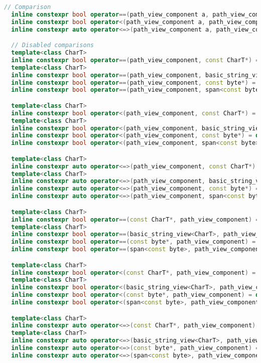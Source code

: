 \documentclass[11pt]{article}
\begin{document}
\begin{lstlisting}[language=cpp]
  // Comparison
  inline constexpr bool operator==(path_view_component a, path_view_component b) noexcept;
  inline constexpr bool operator<(path_view_component a, path_view_component b) noexcept;
  inline constexpr auto operator<=>(path_view_component a, path_view_component b) = default;

  // Disabled comparisons
  template<class CharT>
  inline constexpr bool operator==(path_view_component, const CharT*) = delete;
  template<class CharT>
  inline constexpr bool operator==(path_view_component, basic_string_view<CharT>) = delete;
  inline constexpr bool operator==(path_view_component, const byte*) = delete;
  inline constexpr bool operator==(path_view_component, span<const byte>) = delete;

  template<class CharT>
  inline constexpr bool operator<(path_view_component, const CharT*) = delete;
  template<class CharT>
  inline constexpr bool operator<(path_view_component, basic_string_view<CharT>) = delete;
  inline constexpr bool operator<(path_view_component, const byte*) = delete;
  inline constexpr bool operator<(path_view_component, span<const byte>) = delete;

  template<class CharT>
  inline constexpr auto operator<=>(path_view_component, const CharT*) = delete;
  template<class CharT>
  inline constexpr auto operator<=>(path_view_component, basic_string_view<CharT>) = delete;
  inline constexpr auto operator<=>(path_view_component, const byte*) = delete;
  inline constexpr auto operator<=>(path_view_component, span<const byte>) = delete;

  template<class CharT>
  inline constexpr bool operator==(const CharT*, path_view_component) = delete;
  template<class CharT>
  inline constexpr bool operator==(basic_string_view<CharT>, path_view_component) = delete;
  inline constexpr bool operator==(const byte*, path_view_component) = delete;
  inline constexpr bool operator==(span<const byte>, path_view_component) = delete;

  template<class CharT>
  inline constexpr bool operator<(const CharT*, path_view_component) = delete;
  template<class CharT>
  inline constexpr bool operator<(basic_string_view<CharT>, path_view_component) = delete;
  inline constexpr bool operator<(const byte*, path_view_component) = delete;
  inline constexpr bool operator<(span<const byte>, path_view_component) = delete;

  template<class CharT>
  inline constexpr auto operator<=>(const CharT*, path_view_component) = delete;
  template<class CharT>
  inline constexpr auto operator<=>(basic_string_view<CharT>, path_view_component) = delete;
  inline constexpr auto operator<=>(const byte*, path_view_component) = delete;
  inline constexpr auto operator<=>(span<const byte>, path_view_component) = delete;


\end{lstlisting}
\end{document}
